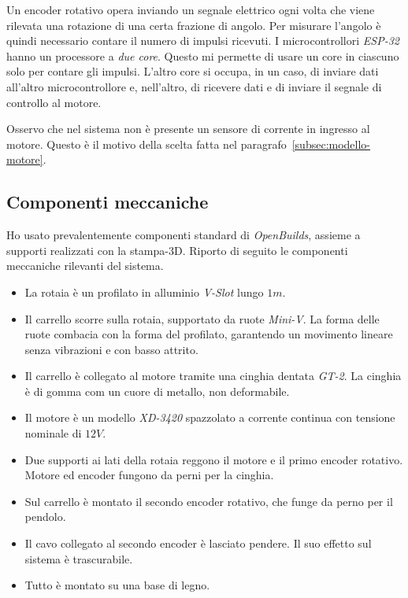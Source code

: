 Un encoder rotativo opera inviando un segnale elettrico ogni volta che
viene rilevata una rotazione di una certa frazione di angolo.
Per misurare l'angolo è quindi necessario contare il numero di impulsi
ricevuti.
I microcontrollori \emph{ESP-32} hanno un processore a \emph{due core}.
Questo mi permette di usare un core in ciascuno solo per
contare gli impulsi.
L'altro core si occupa, in un caso, di inviare dati all'altro microcontrollore
e, nell'altro, di ricevere dati e di inviare il segnale di controllo al motore.

Osservo che nel sistema non è presente un sensore di corrente in ingresso al motore.
Questo è il motivo della scelta fatta nel paragrafo~\ref{subsec:modello-motore}.

\subsection{Componenti meccaniche}
\label{subsec:componenti-meccaniche}
Ho usato prevalentemente componenti standard di \emph{OpenBuilds},
assieme a supporti realizzati con la stampa-3D.
Riporto di seguito le componenti meccaniche rilevanti del sistema.
\begin{itemize}
    \item La rotaia è un profilato in alluminio \emph{V-Slot} lungo $1m$.

    \item Il carrello scorre sulla rotaia, supportato da ruote \emph{Mini-V}.
    La forma delle ruote combacia con la forma del profilato, garantendo
    un movimento lineare senza vibrazioni e con basso attrito.

    \item Il carrello è collegato al motore tramite una cinghia dentata \emph{GT-2}.
    La cinghia è di gomma com un cuore di metallo, non deformabile.

    \item Il motore è un modello \emph{XD-3420} spazzolato a corrente continua
    con tensione nominale di $12V$.

    \item Due supporti ai lati della rotaia reggono il motore e il primo
    encoder rotativo.
    Motore ed encoder fungono da perni per la cinghia.

    \item Sul carrello è montato il secondo encoder rotativo,
    che funge da perno per il pendolo.

    \item Il cavo collegato al secondo encoder è lasciato pendere.
    Il suo effetto sul sistema è trascurabile.

    \item Tutto è montato su una base di legno.

\end{itemize}
